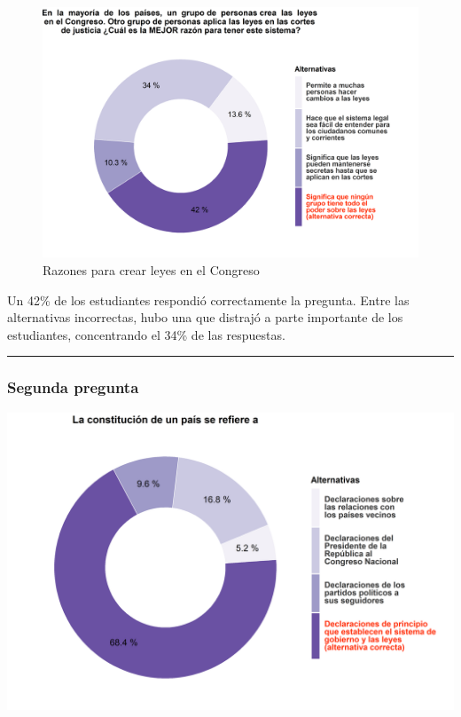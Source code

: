 \documentclass[
  14pt,
]{book}
\begin{document}
\begin{figure}

{\centering \includegraphics[width=52.49in]{images/ccivico_1} 

}

\caption{Razones para crear leyes en el Congreso}\label{fig:unnamed-chunk-2}
\end{figure}

Un 42\% de los estudiantes respondió correctamente la pregunta. Entre las alternativas incorrectas, hubo una que distrajó a parte importante de los estudiantes, concentrando el 34\% de las respuestas.

\begin{center}\rule{0.5\linewidth}{0.5pt}\end{center}

\hypertarget{segunda-pregunta}{%
\subsubsection{Segunda pregunta}\label{segunda-pregunta}}

\begin{center}\includegraphics[width=52.49in]{images/ccivico_2} \end{center}
\end{document}
